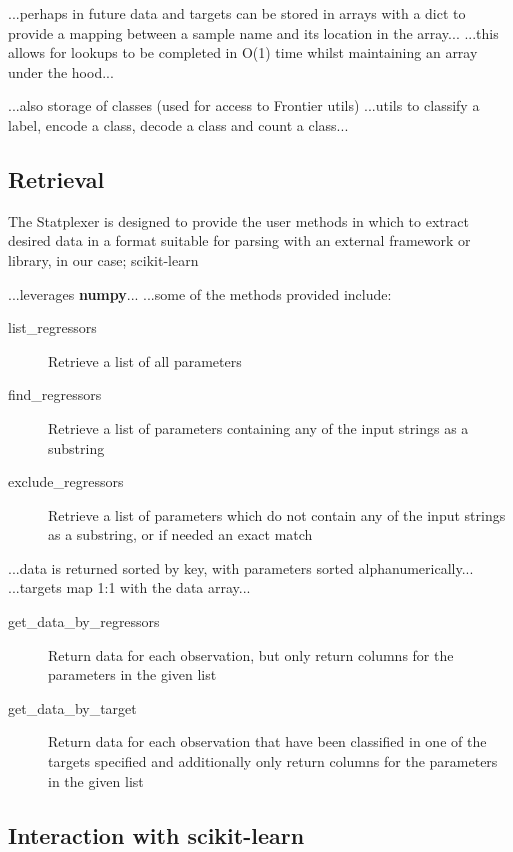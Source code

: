 ...perhaps in future data and targets can be stored in arrays with a dict to
provide a mapping between a sample name and its location in the array...
...this allows for lookups to be completed in O(1) time whilst maintaining an
array under the hood...

...also storage of classes (used for access to Frontier utils)
...utils to classify a label, encode a class, decode a class and count a
class...


\subsection{Retrieval}
The Statplexer is designed to provide the user methods in which to extract
desired data in a format suitable for parsing with an external framework or
library, in our case; scikit-learn

...leverages \textbf{numpy}...
...some of the methods provided include:

\begin{description}
    \item[list\_regressors] Retrieve a list of all parameters
    \item[find\_regressors] Retrieve a list of parameters containing any of the
        input strings as a substring
    \item[exclude\_regressors] Retrieve a list of parameters which do not
        contain any of the input strings as a substring, or if needed an exact
        match
\end{description}

...data is returned sorted by key, with parameters sorted alphanumerically...
...targets map 1:1 with the data array...

\begin{description}
    \item[get\_data\_by\_regressors] Return data for each observation, but only
        return columns for the parameters in the given list
    \item[get\_data\_by\_target] Return data for each observation that have been
        classified in one of the targets specified and additionally only
        return columns for the parameters in the given list
\end{description}

\subsection{Interaction with scikit-learn}
